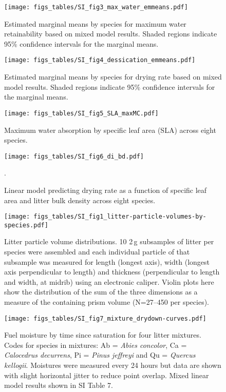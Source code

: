 \documentclass[letterpaper]{article}
\begin{document}
\begin{figure}[H]
  \centering
  \label{SI_fig1}
  \texttt{[image: figs\_tables/SI\_fig3\_max\_water\_emmeans.pdf]}
\caption{Estimated marginal means by species for maximum water retainability based on mixed model results. Shaded regions indicate 95\% confidence intervals for the marginal means.}
\end{figure}


\begin{figure}[H]
  \centering
  \label{SI_fig3}
\texttt{[image: figs\_tables/SI\_fig4\_dessication\_emmeans.pdf]}
\caption{Estimated marginal means by species for drying rate based on mixed model results. Shaded regions indicate 95\% confidence intervals for the marginal means.}
\end{figure}

\begin{figure}[H]
  \centering
\texttt{[image: figs\_tables/SI\_fig5\_SLA\_maxMC.pdf]}
\caption{Maximum water absorption by specific leaf area (SLA) across eight species.}
  \label{SI_fig4}
\end{figure}


\begin{figure}[H]
  \centering
\texttt{[image: figs\_tables/SI\_fig6\_di\_bd.pdf]}
\caption{Linear model predicting drying rate as a function of specific leaf area and litter bulk density across eight species.}.
  \label{SI_fig5}
\end{figure}

\begin{figure}[H]
  \centering
  \texttt{[image: figs\_tables/SI\_fig1\_litter-particle-volumes-by-species.pdf]}
   \label{SI_fig6}
   \caption{Litter particle volume distributions. 10 2\,g subsamples of litter per species were assembled and each individual particle of that subsample was measured for length (longest axis), width (longest axis perpendicular to length) and thickness (perpendicular to length and width, at midrib) using an electronic caliper. Violin plots here show the distribution of the sum of the three dimensions as a measure of the containing prism volume (N=27--450 per species).}
\end{figure}


\begin{figure}[H]
  \centering
\texttt{[image: figs\_tables/SI\_fig7\_mixture\_drydown-curves.pdf]}
\caption{Fuel moisture by time since saturation for four litter mixtures.  Codes for species in mixtures: Ab = \emph{Abies concolor}, Ca = \emph{Calocedrus decurrens}, Pi = \emph{Pinus jeffreyi} and Qu = \emph{Quercus kellogii}. Moistures were measured every 24 hours but data are shown with slight horizontal jitter to reduce point overlap. Mixed linear model results shown in SI Table 7.}
  \label{SI_fig7}
\end{figure}
\end{document}
